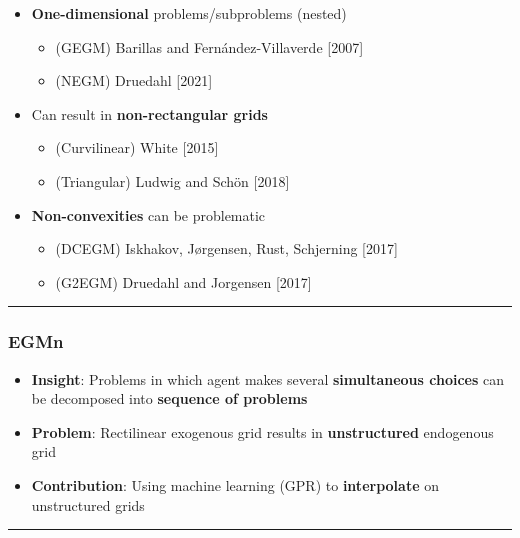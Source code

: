 \documentclass[
  letterpaper,
  DIV=11,
  numbers=noendperiod]{scrartcl}
\providecommand{\tightlist}{%
  \setlength{\itemsep}{0pt}\setlength{\parskip}{0pt}}\usepackage{longtable,booktabs,array}
\begin{document}
\begin{itemize}
\tightlist
\item
  \textbf{One-dimensional} problems/subproblems (nested)

  \begin{itemize}
  \tightlist
  \item
    (GEGM) Barillas and Fernández-Villaverde {[}2007{]}
  \item
    (NEGM) Druedahl {[}2021{]}
  \end{itemize}
\item
  Can result in \textbf{non-rectangular grids}

  \begin{itemize}
  \tightlist
  \item
    (Curvilinear) White {[}2015{]}
  \item
    (Triangular) Ludwig and Schön {[}2018{]}
  \end{itemize}
\item
  \textbf{Non-convexities} can be problematic

  \begin{itemize}
  \tightlist
  \item
    (DCEGM) Iskhakov, Jørgensen, Rust, Schjerning {[}2017{]}
  \item
    (G2EGM) Druedahl and Jorgensen {[}2017{]}
  \end{itemize}
\end{itemize}

\begin{center}\rule{0.5\linewidth}{0.5pt}\end{center}

\hypertarget{egmn}{%
\subsubsection{EGMn}\label{egmn}}

\begin{itemize}
\tightlist
\item
  \textbf{Insight}: Problems in which agent makes several
  \textbf{simultaneous choices} can be decomposed into \textbf{sequence
  of problems}
\item
  \textbf{Problem}: Rectilinear exogenous grid results in
  \textbf{unstructured} endogenous grid
\item
  \textbf{Contribution}: Using machine learning (GPR) to
  \textbf{interpolate} on unstructured grids
\end{itemize}

\begin{center}\rule{0.5\linewidth}{0.5pt}\end{center}
\end{document}
